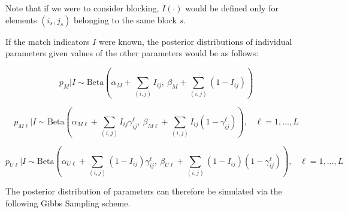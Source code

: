 \documentclass[11pt,reqno]{amsart}
\begin{document}
Note that if we were to consider blocking, $I(\cdot)$ would be defined only for elements $(i_s,j_s)$ belonging to the same block $s$. 
 
If the match indicators $I$ were known, the posterior distributions of individual parameters given values of the other parameters would be as follows:

\begin{equation}
p_M | I \sim \text{Beta}\left(\alpha_M + \sum_{(i,j)} I_{ij},\ \beta_M + \sum_{(i,j)} (1- I_{ij})\right) 
\label{eq:pM}
\end{equation}

\begin{equation}
p_{M\ell} | I \sim \text{Beta}\left(\alpha_{M\ell} + \sum_{(i,j)} I_{ij}\gamma_{ij}^{\ell},\ \beta_{M\ell} + \sum_{(i,j)} I_{ij} (1-\gamma_{ij}^{\ell})\right), \hspace{10pt} \ell = 1,\dots, L
\label{eq:pML}
\end{equation}

\begin{equation}
p_{U\ell} | I \sim \text{Beta}\left(\alpha_{U\ell} + \sum_{(i,j)}(1-I_{ij})\gamma_{ij}^{\ell},\ \beta_{U\ell} + \sum_{(i,j)}(1-I_{ij})(1-\gamma_{ij}^{\ell})\right), \hspace{10pt} \ell = 1,\dots, L
\label{eq:pUL}
\end{equation}

The posterior distribution of parameters can therefore be simulated via the following Gibbs Sampling scheme.
\end{document}
